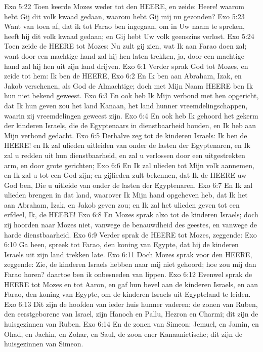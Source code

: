 Exo 5:22  Toen keerde Mozes weder tot den HEERE, en zeide: Heere! waarom hebt Gij dit volk kwaad gedaan, waarom hebt Gij mij nu gezonden?
Exo 5:23  Want van toen af, dat ik tot Farao ben ingegaan, om in Uw naam te spreken, heeft hij dit volk kwaad gedaan; en Gij hebt Uw volk geenszins verlost.
Exo 5:24  Toen zeide de HEERE tot Mozes: Nu zult gij zien, wat Ik aan Farao doen zal; want door een machtige hand zal hij hen laten trekken, ja, door een machtige hand zal hij hen uit zijn land drijven.
Exo 6:1  Verder sprak God tot Mozes, en zeide tot hem: Ik ben de HEERE,
Exo 6:2  En Ik ben aan Abraham, Izak, en Jakob verschenen, als God de Almachtige; doch met Mijn Naam HEERE ben Ik hun niet bekend geweest.
Exo 6:3  En ook heb Ik Mijn verbond met hen opgericht, dat Ik hun geven zou het land Kanaan, het land hunner vreemdelingschappen, waarin zij vreemdelingen geweest zijn.
Exo 6:4  En ook heb Ik gehoord het gekerm der kinderen Israels, die de Egyptenaars in dienstbaarheid houden, en Ik heb aan Mijn verbond gedacht.
Exo 6:5  Derhalve zeg tot de kinderen Israels: Ik ben de HEERE! en Ik zal ulieden uitleiden van onder de lasten der Egyptenaren, en Ik zal u redden uit hun dienstbaarheid, en zal u verlossen door een uitgestrekten arm, en door grote gerichten;
Exo 6:6  En Ik zal ulieden tot Mijn volk aannemen, en Ik zal u tot een God zijn; en gijlieden zult bekennen, dat Ik de HEERE uw God ben, Die u uitleide van onder de lasten der Egyptenaren.
Exo 6:7  En Ik zal ulieden brengen in dat land, waarover Ik Mijn hand opgeheven heb, dat Ik het aan Abraham, Izak, en Jakob geven zou; en Ik zal het ulieden geven tot een erfdeel, Ik, de HEERE!
Exo 6:8  En Mozes sprak alzo tot de kinderen Israels; doch zij hoorden naar Mozes niet, vanwege de benauwdheid des geestes, en vanwege de harde dienstbaarheid.
Exo 6:9  Verder sprak de HEERE tot Mozes, zeggende:
Exo 6:10  Ga heen, spreek tot Farao, den koning van Egypte, dat hij de kinderen Israels uit zijn land trekken late.
Exo 6:11  Doch Mozes sprak voor den HEERE, zeggende: Zie, de kinderen Israels hebben naar mij niet gehoord; hoe zou mij dan Farao horen? daartoe ben ik onbesneden van lippen.
Exo 6:12  Evenwel sprak de HEERE tot Mozes en tot Aaron, en gaf hun bevel aan de kinderen Israels, en aan Farao, den koning van Egypte, om de kinderen Israels uit Egypteland te leiden.
Exo 6:13  Dit zijn de hoofden van ieder huis hunner vaderen: de zonen van Ruben, den eerstgeborene van Israel, zijn Hanoch en Pallu, Hezron en Charmi; dit zijn de huisgezinnen van Ruben.
Exo 6:14  En de zonen van Simeon: Jemuel, en Jamin, en Ohad, en Jachin, en Zohar, en Saul, de zoon ener Kanaanietische; dit zijn de huisgezinnen van Simeon.
